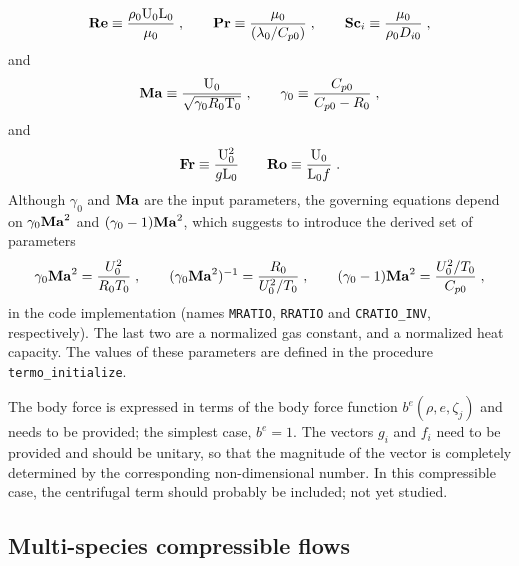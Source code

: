 \begin{equation}
  \mathrm{\bf Re} \equiv \frac{\rho_0 \mathrm{U}_0 \mathrm{L}_0}{\mu_0}\;, \qquad
  \mathrm{\bf Pr} \equiv \frac{\mu_0}{(\lambda_0/C_{p0})}\;, \qquad
  \mathrm{\bf Sc}_i \equiv \frac{\mu_0}{\rho_0 D_{i0}}\;,
\end{equation}
and
\begin{equation}
  \mathrm{\bf Ma}  \equiv \frac{\mathrm{U}_0}{\sqrt{\gamma_0 R_0 \mathrm{T}_0}}\;, \qquad
  \gamma_0 \equiv \frac{C_{p0}}{C_{p0}-R_0}\;,
\end{equation}
and
\begin{equation}
  \mathrm{\bf Fr} \equiv \frac{\mathrm{U}_0^2}{g\mathrm{L}_0} \qquad \mathrm{\bf Ro} \equiv \frac{\mathrm{U}_0}{\mathrm{L}_0f} \;.
\end{equation}
Although $\gamma_0$ and $\mathrm{\bf Ma}$ are the input parameters, the governing equations depend on $\gamma_0\mathrm{\bf Ma}^2$ and $(\gamma_0-1)\mathrm{\bf Ma}^2$, which suggests to introduce the derived set of parameters
\begin{equation}
    \gamma_0\mathrm{\bf Ma}^2=\frac{U_0^2}{R_0T_0}\;,\qquad (\gamma_0\mathrm{\bf Ma}^2)^{-1}=\frac{R_0}{U^2_0/T_0}\;,\qquad (\gamma_0-1)\mathrm{\bf Ma}^2 =\frac{U_0^2/T_0}{C_{p0}} \;,
\end{equation}
in the code implementation (names \texttt{MRATIO}, \texttt{RRATIO} and \texttt{CRATIO\_INV}, respectively). The last two are a normalized gas constant, and a normalized heat capacity. The values of these parameters are defined in the procedure \texttt{termo\_initialize}.

The body force is expressed in terms of the body force function $b^e(\rho,e,\zeta_j)$ and needs to be provided; the simplest case, $b^e=1$. The vectors $g_i$ and $f_i$ need to be provided and should be unitary, so that the magnitude of the vector is completely determined by the corresponding non-dimensional number. In this compressible case, the centrifugal term should probably be included; not yet studied.

\subsection{Multi-species compressible flows}

